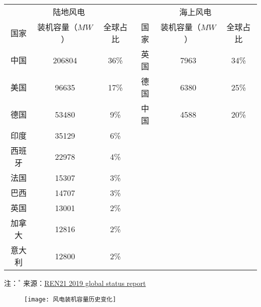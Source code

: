 \begin{table}[!htbp]
    \label{tab:windcapacitybycountry}
    \centering
    \small%
    \setlength{\tabcolsep}{5 pt}%
    \renewcommand{\arraystretch}{1.0}%
    \begin{tabular}{cccccc}
        \hline
         \multicolumn{3}{c}{陆地风电} &  \multicolumn{3}{c}{海上风电} \\
         国家 & 装机容量（$MW$） & 全球占比 & 国家 & 装机容量（$MW$） & 全球占比 \\
        \hline
        中国 & 206804 & 36\% & 英国 & 7963 & 34\% \\
        美国 & 96635 & 17\% & 德国 & 6380 & 25\% \\
        德国 & 53480 & 9\% & 中国 & 4588 & 20\% \\
        印度 & 35129 & 6\% & & & \\
        西班牙 & 22978 & 4\% & & & \\
        法国 & 15307 & 3\% & & & \\
        巴西 & 14707 & 3\% & & & \\
        英国 & 13001 & 2\% & & & \\
        加拿大 & 12816 & 2\% & & & \\
        意大利 & 12800 & 2\% & & & \\
        \hline
    \end{tabular}
    
     \vspace*{3ex}  
      
    \begin{minipage}{0.8\textwidth}%
    注：$^*$ 来源：\href{https://www.ren21.net/wp-content/uploads/2019/05/gsr_2019_full_report_en.pdf}{REN21 2019 global status report} 
    \end{minipage}
\end{table}

\begin{figure}[!htbp]
    \centering
    \texttt{[image: 风电装机容量历史变化]}
    \label{fig:windcapacityhistory}
\end{figure}

